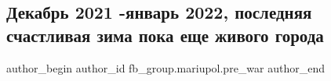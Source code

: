  
 
 
 
 

\subsection{Декабрь 2021 -январь 2022, последняя счастливая зима пока еще живого города}
\label{sec:09_01_2023.fb.fb_group.mariupol.pre_war.1.dekabr_2021__yanvar_}

\ifcmt
 author_begin
   author_id fb_group.mariupol.pre_war
 author_end
\fi
